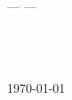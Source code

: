 \begin{titlepage}

    \begin{center}

		\hfill{}\\[3cm]
		
		{\small--- \elegancecourse ---}\\[0.4cm]
		\parbox[c]{13cm}{\centering\LARGE\elegancetitle}\\[2cm]
		{\large\eleganceauthor}\\[0.2cm]
		{\eleganceemail}\\[1cm]
		\today

    \end{center}

\end{titlepage}